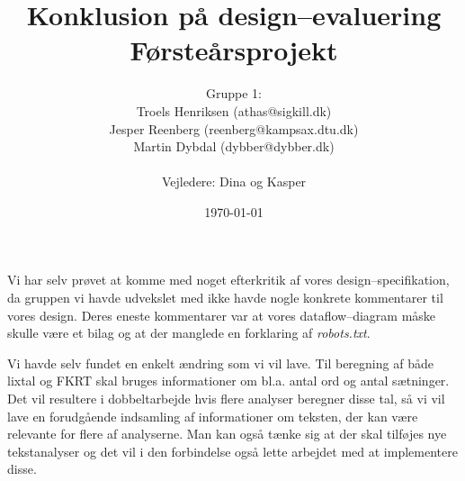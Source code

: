 \documentclass[a4paper,oneside,article]{article}
\title{Konklusion på design--evaluering  \\
       \small{Førsteårsprojekt}}
\author
{
  Gruppe 1:\\
  Troels Henriksen (athas@sigkill.dk)\\
  Jesper Reenberg (reenberg@kampsax.dtu.dk)\\
  Martin Dybdal (dybber@dybber.dk)\\ \\
  Vejledere: Dina og Kasper
}
\date{\today}
\begin{document}
\maketitle

Vi har selv prøvet at komme med noget efterkritik af vores
design--specifikation, da gruppen vi havde udvekslet med ikke havde
nogle konkrete kommentarer til vores design. Deres eneste kommentarer
var at vores dataflow--diagram måske skulle være et bilag og at der
manglede en forklaring af \textit{robots.txt}.

Vi havde selv fundet en enkelt ændring som vi vil lave. Til beregning
af både lixtal og FKRT skal bruges informationer om bl.a. antal ord og
antal sætninger. Det vil resultere i dobbeltarbejde hvis flere
analyser beregner disse tal, så vi vil lave en forudgående indsamling
af informationer om teksten, der kan være relevante for flere af
analyserne. Man kan også tænke sig at der skal tilføjes nye
tekstanalyser og det vil i den forbindelse også lette arbejdet med at
implementere disse.
\end{document}
